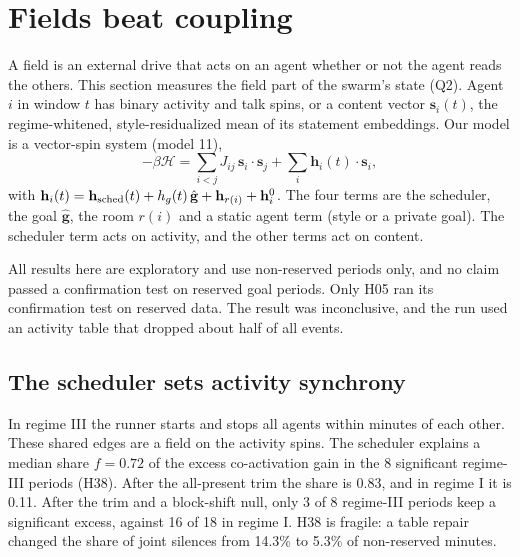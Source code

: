 \section{Fields beat coupling}
\label{sec:fields}

A field is an external drive that acts on an agent whether or not the agent reads the others. This section measures the field part of the swarm's state (Q2). Agent $i$ in window $t$ has binary activity and talk spins, or a content vector $\mathbf s_i(t)$, the regime-whitened, style-residualized mean of its statement embeddings. Our model is a vector-spin system (model 11),
\begin{equation}
-\beta\mathcal H=\sum_{i<j}J_{ij}\,\mathbf s_i\cdot\mathbf s_j+\sum_i\mathbf h_i(t)\cdot\mathbf s_i ,
\label{eq:fields-H}
\end{equation}
with $\mathbf h_i(t)=\mathbf h_{\rm sched}(t)+h_g(t)\,\hat{\mathbf g}+\mathbf h_{r(i)}+\mathbf h_i^{0}$. The four terms are the scheduler, the goal $\hat{\mathbf g}$, the room $r(i)$ and a static agent term (style or a private goal). The scheduler term acts on activity, and the other terms act on content.

All results here are exploratory and use non-reserved periods only, and no claim passed a confirmation test on reserved goal periods. Only H05 ran its confirmation test on reserved data. The result was inconclusive, and the run used an activity table that dropped about half of all events.

\subsection{The scheduler sets activity synchrony}

In regime III the runner starts and stops all agents within minutes of each other. These shared edges are a field on the activity spins. The scheduler explains a median share $f=0.72$ of the excess co-activation gain in the 8 significant regime-III periods (H38). After the all-present trim the share is 0.83, and in regime I it is 0.11. After the trim and a block-shift null, only 3 of 8 regime-III periods keep a significant excess, against 16 of 18 in regime I. H38 is fragile: a table repair changed the share of joint silences from 14.3\% to 5.3\% of non-reserved minutes.

